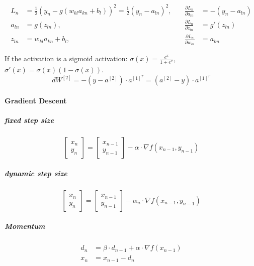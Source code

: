 \begin{align*}
	L_n &= \frac{1}{2} (y_{n} - g(w_{kl}a_{kn} + b_l))^2 = \frac{1}{2} (y_n - a_{ln})^2, \quad &\frac{\partial L_n}{\partial a_{ln}} &= -(y_n - a_{ln})\\
	a_{ln} &= g(z_{ln}) , \quad &\frac{\partial L_n}{\partial z_{ln}} &= g'(z_{ln}) \\
	z_{ln} &= w_{kl}a_{kn} + b_l, \quad &\frac{\partial L_n}{\partial w_{ln}} &= a_{kn} 	
\end{align*}

If the activation is a sigmoid activation: $\sigma(x) = \frac{e^x}{1 + e^x}$, $\sigma'(x) = \sigma(x)(1 - \sigma(x))$.
$$dW^{[2]} = -(y- a^{[2]})\cdot a^{[1]^{T}} = (a^{[2]} - y) \cdot a^{[1]^{T}}$$

\paragraph{Gradient Descent}

	\subparagraph{fixed step size}
	$$\begin{bmatrix}
	x_n \\y_n
	\end{bmatrix} = \begin{bmatrix}
	x_{n-1} \\ y_{n-1}
	\end{bmatrix} - \alpha \cdot \nabla f(x_{n-1}, y_{n-1})$$
	\subparagraph{dynamic step size}
	$$\begin{bmatrix}
	x_n \\y_n
	\end{bmatrix} = \begin{bmatrix}
	x_{n-1} \\ y_{n-1}
	\end{bmatrix} - \alpha_{n} \cdot \nabla f(x_{n-1}, y_{n-1})$$
	
	\subparagraph{Momentum}
	\begin{align*}
		d_n &= \beta \cdot d_{n-1} + \alpha \cdot\nabla f(x_{n-1})\\
		x_n &= x_{n-1} - d_n
	\end{align*}


